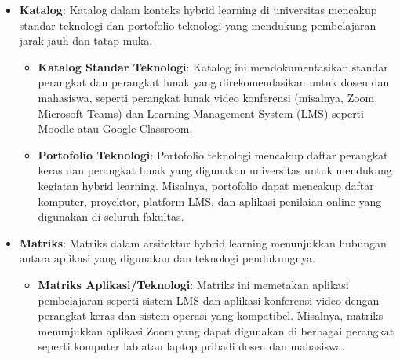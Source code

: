 \begin{itemize}
	\item \textbf{Katalog}: Katalog dalam konteks hybrid learning di universitas mencakup standar teknologi dan portofolio teknologi yang mendukung pembelajaran jarak jauh dan tatap muka.
	\begin{itemize}
		\item \textbf{Katalog Standar Teknologi}: Katalog ini mendokumentasikan standar perangkat dan perangkat lunak yang direkomendasikan untuk dosen dan mahasiswa, seperti perangkat lunak video konferensi (misalnya, Zoom, Microsoft Teams) dan Learning Management System (LMS) seperti Moodle atau Google Classroom.
		\item \textbf{Portofolio Teknologi}: Portofolio teknologi mencakup daftar perangkat keras dan perangkat lunak yang digunakan universitas untuk mendukung kegiatan hybrid learning. Misalnya, portofolio dapat mencakup daftar komputer, proyektor, platform LMS, dan aplikasi penilaian online yang digunakan di seluruh fakultas.
	\end{itemize}
	
	\item \textbf{Matriks}: Matriks dalam arsitektur hybrid learning menunjukkan hubungan antara aplikasi yang digunakan dan teknologi pendukungnya.
	\begin{itemize}
		\item \textbf{Matriks Aplikasi/Teknologi}: Matriks ini memetakan aplikasi pembelajaran seperti sistem LMS dan aplikasi konferensi video dengan perangkat keras dan sistem operasi yang kompatibel. Misalnya, matriks menunjukkan aplikasi Zoom yang dapat digunakan di berbagai perangkat seperti komputer lab atau laptop pribadi dosen dan mahasiswa.
	\end{itemize}
	

\end{itemize}
